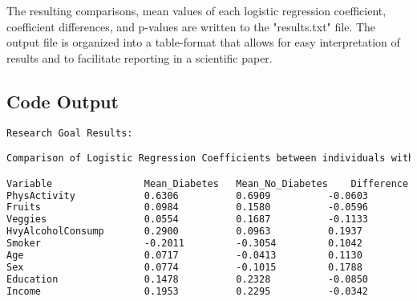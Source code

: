 \documentclass[12pt]{article}
\begin{document}
The resulting comparisons, mean values of each logistic regression coefficient, coefficient differences, and p-values are written to the "results.txt" file. The output file is organized into a table-format that allows for easy interpretation of results and to facilitate reporting in a scientific paper.

\subsection{Code Output}

\begin{lstlisting}[language=TeX]
Research Goal Results:

Comparison of Logistic Regression Coefficients between individuals with and without diabetes:

Variable            	Mean_Diabetes	Mean_No_Diabetes	Difference      	p-value         
PhysActivity        	0.6306      	0.6909      	-0.0603         	0.0001          
Fruits              	0.0984      	0.1580      	-0.0596         	0.0004          
Veggies             	0.0554      	0.1687      	-0.1133         	0.0001          
HvyAlcoholConsump   	0.2900      	0.0963      	0.1937          	0.0003          
Smoker              	-0.2011     	-0.3054     	0.1042          	0.0000          
Age                 	0.0717      	-0.0413     	0.1130          	0.0000          
Sex                 	0.0774      	-0.1015     	0.1788          	0.0000          
Education           	0.1478      	0.2328      	-0.0850         	0.0000          
Income              	0.1953      	0.2295      	-0.0342         	0.0000          


\end{lstlisting}
\end{document}

